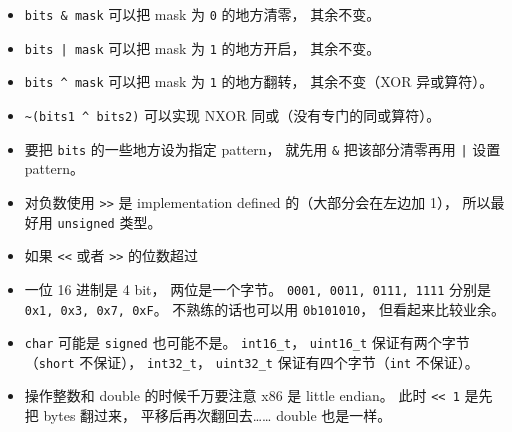
\begin{issues}
\issueDraft
\end{issues}

\begin{itemize}
\item \verb|bits & mask| 可以把 mask 为 \verb|0| 的地方清零， 其余不变。
\item \verb`bits | mask` 可以把 mask 为 \verb|1| 的地方开启， 其余不变。
\item \verb|bits ^ mask| 可以把 mask 为 \verb|1| 的地方翻转， 其余不变（XOR 异或算符）。
\item \verb|~(bits1 ^ bits2)| 可以实现 NXOR 同或（没有专门的同或算符）。
\item 要把 \verb|bits| 的一些地方设为指定 pattern， 就先用 \verb|&| 把该部分清零再用 \verb`|` 设置 pattern。
\item 对负数使用 \verb|>>| 是 implementation defined 的（大部分会在左边加 1）， 所以最好用 \verb|unsigned| 类型。
\item 如果 \verb|<<| 或者 \verb|>>| 的位数超过
\item 一位 16 进制是 4 bit， 两位是一个字节。 \verb|0001, 0011, 0111, 1111| 分别是 \verb|0x1, 0x3, 0x7, 0xF|。 不熟练的话也可以用 \verb|0b101010|， 但看起来比较业余。
\item \verb|char| 可能是 \verb|signed| 也可能不是。 \verb|int16_t|， \verb|uint16_t| 保证有两个字节（\verb|short| 不保证）， \verb|int32_t|， \verb|uint32_t| 保证有四个字节（\verb|int| 不保证）。
\item 操作整数和 double 的时候千万要注意 x86 是 little endian。 此时 \verb|<< 1| 是先把 bytes 翻过来， 平移后再次翻回去…… double 也是一样。
\end{itemize}
